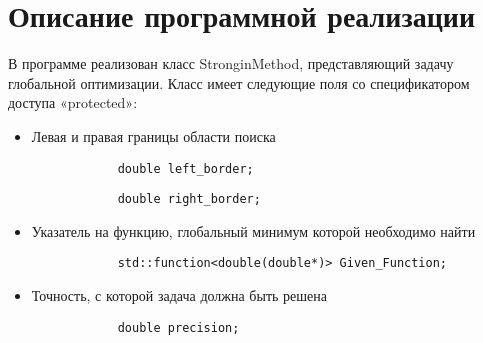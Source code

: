 \documentclass{report}
\begin{document}
	\section*{Описание программной реализации}
	В программе реализован класс StronginMethod, представляющий задачу глобальной оптимизации. Класс имеет следующие поля со спецификатором доступа «protected»:\par
	\begin{itemize}
		\item Левая и правая границы области поиска\par
		\begin{lstlisting}
			double left_border;
		\end{lstlisting}\par
		\begin{lstlisting}
			double right_border;
		\end{lstlisting}\par
		\item Указатель на функцию, глобальный минимум которой необходимо найти \par
		\begin{lstlisting}
			std::function<double(double*)> Given_Function;
		\end{lstlisting}\par
		\item Точность, с которой задача должна быть решена \par
		\begin{lstlisting}
			double precision;
		\end{lstlisting}\par
	\end{itemize}
	
\end{document}
